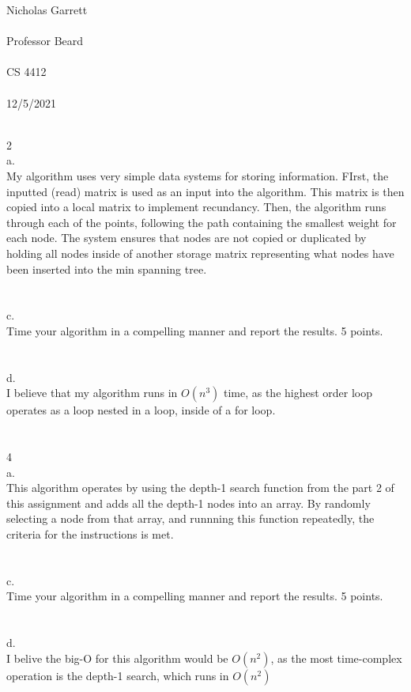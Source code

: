 \documentclass[12pt, a4paper]{article}
\begin{document}
\noindent
Nicholas Garrett\\ \\
Professor Beard\\ \\
CS 4412\\ \\
12/5/2021\\ \\


\begin{center}
\end{center}


2\\
a.\\
My algorithm uses very simple data systems for storing information.  
FIrst, the inputted (read) matrix is used as an input into the algorithm.  This matrix is then copied into a local matrix to implement recundancy.
Then, the algorithm runs through each of the points, following the path containing the smallest weight for each node.  The system ensures that nodes are not copied or duplicated by holding all nodes inside of another storage matrix representing what nodes have been inserted into the min spanning tree. \\ \\ \\

c.\\
	Time your algorithm in a compelling manner and report the results. 5 points. \\ \\ \\

d.\\
	I believe that my algorithm runs in \(O(n^3)\) time, as the highest order loop operates as a loop nested in a loop, inside of a for loop.\\ \\ \\


4\\
a.\\
	This algorithm operates by using the depth-1 search function from the part 2 of this assignment and adds all the depth-1 nodes into an array.  By randomly selecting a node from that array, and runnning this function repeatedly, the criteria for the instructions is met. \\ \\ \\

c.\\
	Time your algorithm in a compelling manner and report the results. 5 points. \\ \\ \\

d.\\
	I belive the big-O for this algorithm would be \(O(n^2)\), as the most time-complex operation is the depth-1 search, which runs in \(O(n^2)\)
\end{document}
